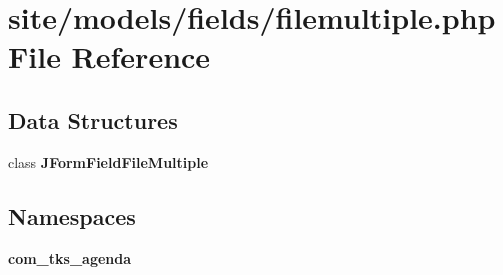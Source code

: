 \section{site/models/fields/filemultiple.php File Reference}
\label{site_2models_2fields_2filemultiple_8php}
\subsection*{Data Structures}
\begin{DoxyCompactItemize}
\item 
class \textbf{ J\+Form\+Field\+File\+Multiple}
\end{DoxyCompactItemize}
\subsection*{Namespaces}
\begin{DoxyCompactItemize}
\item 
 \textbf{ com\+\_\+tks\+\_\+agenda}
\end{DoxyCompactItemize}
